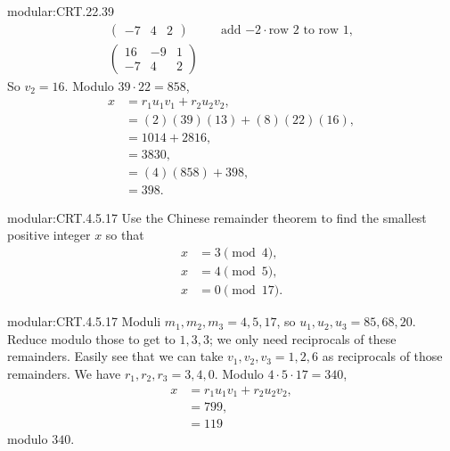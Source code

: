 \begin{answer}{modular:CRT.22.39}
\begin{align*}
\begin{pmatrix}
-7&4&2
\end{pmatrix}
&\quad\text{add \(-2\cdot\)row 2 to row 1},\\
\begin{pmatrix}
16&-9&1\\
-7&4&2
\end{pmatrix}
\end{align*}
So \(v_2=16\).
Modulo \(39\cdot 22=858\), 
\begin{align*}
x&=r_1u_1v_1+r_2u_2v_2,\\
 &=(2)(39)(13)+(8)(22)(16),\\
 &=1014+2816,\\
 &=3830,\\
 &=(4)(858)+398,\\
 &=398.
\end{align*}
\end{answer}
\begin{problem}{modular:CRT.4.5.17}
Use the Chinese remainder theorem to find the smallest positive integer \(x\) so that
\begin{align*}
x&=3\pmod{4},\\
x&=4\pmod{5},\\
x&=0\pmod{17}.
\end{align*}
\end{problem}
\begin{answer}{modular:CRT.4.5.17}
Moduli \(m_1,m_2,m_3=4,5,17\), so \(u_1,u_2,u_3=85,68,20\).
Reduce modulo those to get to \(1,3,3\); we only need reciprocals of these remainders.
Easily see that we can take \(v_1,v_2,v_3=1,2,6\) as reciprocals of those remainders.
We have \(r_1,r_2,r_3=3,4,0\).
Modulo \(4\cdot5\cdot 17=340\), 
\begin{align*}
x&=r_1u_1v_1+r_2u_2v_2,\\
&=799,\\
&=119
\end{align*}
modulo \(340\).
\end{answer}

